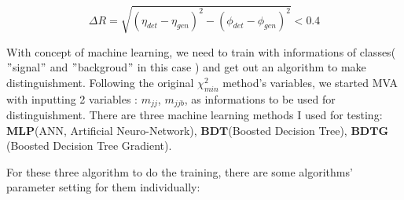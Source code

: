 			\begin{equation}
			\Delta R = \sqrt{ (\eta_{det} - \eta_{gen})^2 - (\phi_{det} - \phi_{gen})^2 } < 0.4
			\label{eq:gen_matching}
			\end{equation}
		
			With concept of machine learning, we need to train with informations of classes( $"$signal$"$ and $"$backgroud$"$ in this case ) and get out an algorithm to make distinguishment. Following the original $\chi^2_{min}$ method's variables, we started MVA with inputting 2 variables : $m_{jj}$, $m_{jjb}$, as informations to be used for distinguishment. There are three machine learning methods I used for testing: $\textbf{MLP}$(ANN, Artificial Neuro-Network), $\textbf{BDT}$(Boosted Decision Tree), $\textbf{BDTG}$(Boosted Decision Tree Gradient).

			For these three algorithm to do the training, there are some algorithms' parameter setting for them individually:

